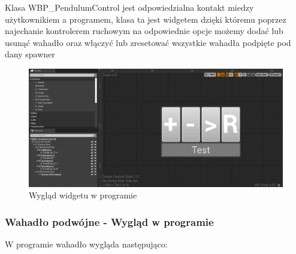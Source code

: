 \documentclass[a4paper,12pt,reqno]{article}
\begin{document}
Klasa WBP\_PendulumControl jest odpowiedzialna kontakt miedzy użytkownikiem a programem, klasa ta jest widgetem dzięki któremu poprzez najechanie kontrolerem ruchowym na odpowiednie opcje możemy dodać lub usunąć wahadło oraz włączyć lub zresetować wszystkie wahadła podpięte pod dany spawner 

\begin{figure}[H]%
\centering
\includegraphics[width=0.7\columnwidth]{graphics/pendulum/PendulumControlBP.png}
\caption{Wygląd widgetu w programie
\label{BPExample}}%
%
\qquad
\end{figure}  

\subsubsection{Wahadło podwójne - Wygląd w programie}
W programie wahadło wygląda następująco:
\end{document}
